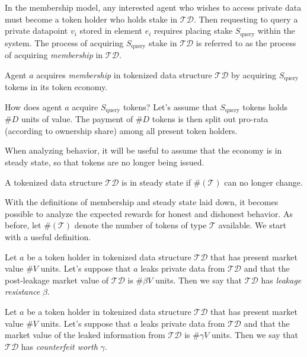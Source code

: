 \documentclass{llncs}
\begin{document}
In the membership model, any interested agent who wishes to access private data must become a token holder who holds stake in $\mathcal{TD}$. Then requesting to query a private datapoint $v_i$ stored in element $e_i$ requires placing stake $S_\text{query}$ within the system. The process of acquiring $S_\text{query}$ stake in $\mathcal{TD}$ is referred to as the process of acquiring \textit{membership} in $\mathcal{TD}$.

\begin{definition}[Membership]
Agent $a$ acquires \textit{membership} in tokenized data structure $\mathcal{TD}$ by acquiring $S_\text{query}$ tokens in its token economy.
\end{definition}

How does agent $a$ acquire $S_\text{query}$ tokens? Let's assume that $S_\text{query}$ tokens holds $\#D$ units of value. The payment of $\#D$ tokens is then split out pro-rata (according to ownership share) among all present token holders.

When analyzing behavior, it will be useful to assume that the economy is in steady state, so that tokens are no longer being issued.

\begin{definition}
A tokenized data structure $\mathcal{TD}$ is in steady state if $\#(\mathcal{T})$ can no longer change.
\end{definition}

With the definitions of membership and steady state laid down, it becomes possible to analyze the expected rewards for honest and dishonest behavior. As before, let $\#(\mathcal{T})$ denote the number of tokens of type $\mathcal{T}$ available. We start with a useful definition.

\begin{definition}
Let $a$ be a token holder in tokenized data structure $\mathcal{TD}$ that has present market value $\#V$ units. Let's suppose that $a$ leaks private data from $\mathcal{TD}$ and that the post-leakage market value of $\mathcal{TD}$ is $\#\beta V$ units. Then we say that $\mathcal{TD}$ has \textit{leakage resistance} $\beta$.
\end{definition}

\begin{definition}
Let $a$ be a token holder in tokenized data structure $\mathcal{TD}$ that has present market value $\#V$ units. Let's suppose that $a$ leaks private data from $\mathcal{TD}$ and that the market value of the leaked information from $\mathcal{TD}$ is $\#\gamma V$ units. Then we say that $\mathcal{TD}$ has \textit{counterfeit worth} $\gamma$.
\end{definition}
\end{document}
